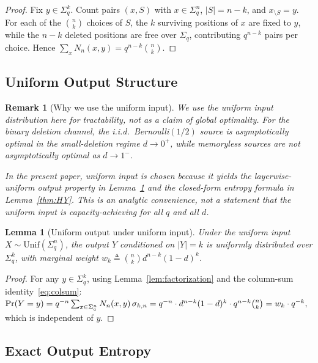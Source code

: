 \documentclass[conference]{IEEEtran}
\newtheorem{lemma}{Lemma}
\newtheorem{remark}{Remark}
\begin{document}
\begin{proof}
Fix $y\in\Sigma_q^k$.  Count pairs $(x,S)$ with $x\in\Sigma_q^n$,
$|S|=n-k$, and $x_{\setminus S}=y$.  For each of the $\binom{n}{k}$
choices of $S$, the $k$ surviving positions of $x$ are fixed to $y$,
while the $n-k$ deleted positions are free over $\Sigma_q$,
contributing $q^{n-k}$ pairs per choice.
Hence $\sum_x N_n(x,y)=q^{n-k}\binom{n}{k}$.
\end{proof}


\subsection{Uniform Output Structure}

\begin{remark}[Why we use the uniform input]
\label{rem:uniform_input}
We use the uniform input distribution here for tractability, not as a
claim of global optimality. For the binary deletion channel, the
i.i.d.\ Bernoulli$(1/2)$ source is asymptotically optimal in the
small-deletion regime $d\to 0^+$, while memoryless sources are not
asymptotically optimal as $d\to 1^-$. \cite{kanoria2013,drmota2012}

In the present paper, uniform input is chosen because it yields the
layerwise-uniform output property in Lemma~\ref{lem:uniform} and the
closed-form entropy formula in Lemma~\ref{thm:HY}. This is an
analytic convenience, not a statement that the uniform input is
capacity-achieving for all $q$ and all $d$.
\end{remark}

\begin{lemma}[Uniform output under uniform input]
\label{lem:uniform}
Under the uniform input $X\sim\mathrm{Unif}(\Sigma_q^n)$, the output
$Y$ conditioned on $|Y|=k$ is uniformly distributed over $\Sigma_q^k$,
with marginal weight $w_k\triangleq \binom{n}{k}d^{n-k}(1-d)^k$.
\end{lemma}

\begin{proof}
For any $y\in\Sigma_q^k$, using Lemma~\ref{lem:factorization}
and the column-sum identity~\eqref{eq:colsum}:
\(
  \Pr(Y=y)
  =q^{-n}\sum_{x\in\Sigma_q^n}N_n(x,y)\,\sigma_{k,n}\\
  =q^{-n}\cdot d^{n-k}(1-d)^k\cdot q^{n-k}\tbinom{n}{k}
  =w_k\cdot q^{-k},
\)
which is independent of $y$.
\end{proof}

\subsection{Exact Output Entropy}
\end{document}
